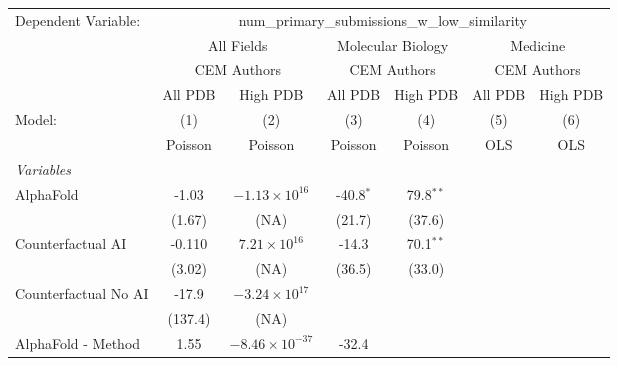 \begingroup
\centering
\begin{tabular}{lcccccc}
   \tabularnewline \midrule \midrule
   Dependent Variable: & \multicolumn{6}{c}{num\_primary\_submissions\_w\_low\_similarity}\\
 & \multicolumn{2}{c}{All Fields} & \multicolumn{2}{c}{Molecular Biology} & \multicolumn{2}{c}{Medicine} \\
\cmidrule(lr){2-3} \cmidrule(lr){4-5} \cmidrule(lr){6-7}
 & \multicolumn{2}{c}{CEM Authors} & \multicolumn{2}{c}{CEM Authors} & \multicolumn{2}{c}{CEM Authors} \\
\cmidrule(lr){2-3} \cmidrule(lr){4-5} \cmidrule(lr){6-7}
 & \multicolumn{1}{c}{All PDB} & \multicolumn{1}{c}{High PDB} & \multicolumn{1}{c}{All PDB} & \multicolumn{1}{c}{High PDB} & \multicolumn{1}{c}{All PDB} & \multicolumn{1}{c}{High PDB} \\
\cmidrule(lr){2-2} \cmidrule(lr){3-3} \cmidrule(lr){4-4} \cmidrule(lr){5-5} \cmidrule(lr){6-6} \cmidrule(lr){7-7}
   Model:                                                  & (1)       & (2)                     & (3)         & (4)         & (5)  & (6)\\  
                                                           &  Poisson  & Poisson                 & Poisson     & Poisson     & OLS  & OLS\\  
   \midrule
   \emph{Variables}\\
   AlphaFold                                               & -1.03     & $-1.13\times 10^{16}$   & -40.8$^{*}$ & 79.8$^{**}$ &      &   \\   
                                                           & (1.67)    & (NA)                    & (21.7)      & (37.6)      &      &   \\   
   Counterfactual AI                                       & -0.110    & $7.21\times 10^{16}$    & -14.3       & 70.1$^{**}$ &      &   \\   
                                                           & (3.02)    & (NA)                    & (36.5)      & (33.0)      &      &   \\   
   Counterfactual No AI                                    & -17.9     & $-3.24\times 10^{17}$   &             &             &      &   \\   
                                                           & (137.4)   & (NA)                    &             &             &      &   \\   
   AlphaFold - Method                                      & 1.55      & $-8.46\times 10^{-37}$  & -32.4       &             &      &   \\   

\end{tabular}
